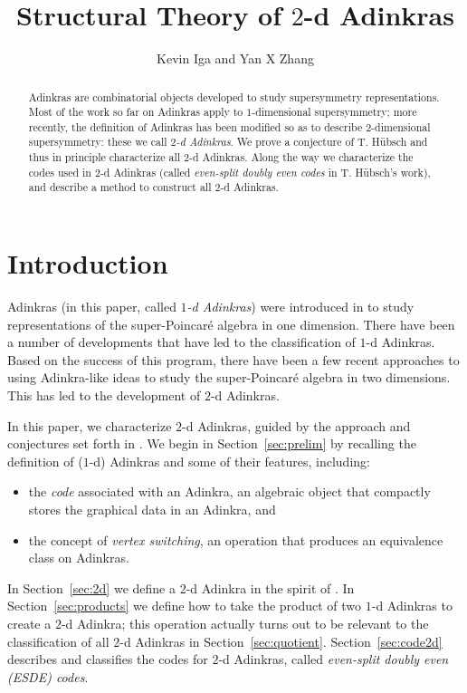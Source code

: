 \documentclass[12pt,twoside,singlespace]{article}
\title{Structural Theory of $2$-d Adinkras}
\author{Kevin Iga and Yan X Zhang}
\numberwithin{equation}{section}
\theoremstyle{definition}
\begin{document}
\pagestyle{plain}

\maketitle

\begin{abstract}
Adinkras are combinatorial objects developed to study supersymmetry representations. Most of the work so far on Adinkras apply to $1$-dimensional supersymmetry; more recently, the definition of Adinkras has been modified so as to describe $2$-dimensional supersymmetry: these we call \emph{$2$-d Adinkras}.  We prove a conjecture of T. H\"ubsch and thus in principle characterize all $2$-d Adinkras.  Along the way we characterize the codes used in $2$-d Adinkras (called \emph{even-split doubly even codes} in T. H\"ubsch's work), and describe a method to construct all $2$-d Adinkras.
\end{abstract}


\section{Introduction}
Adinkras (in this paper, called \emph{$1$-d Adinkras}) were introduced in \cite{d2l:first} to study representations of the super-Poincar\'e algebra in one dimension.  There have been a number of developments that have led to the classification of $1$-d Adinkras.\cite{d2l:graph-theoretic,d2l:omni,d2l:topology,zhang:adinkras,dil:cohomology,d2l:decodes}  Based on the success of this program, there have been a few recent approaches to using Adinkra-like ideas to study the super-Poincar\'e algebra in two dimensions.  This has led to the development of $2$-d Adinkras.\cite{gates:dimensional_extension,hubsch:weaving}

In this paper, we characterize $2$-d Adinkras, guided by the approach and conjectures set forth in \cite{hubsch:weaving}. We begin in Section~\ref{sec:prelim} by recalling the definition of ($1$-d) Adinkras and some of their features, including:
\begin{itemize}
\item the \emph{code} associated with an Adinkra, an algebraic object that compactly stores the graphical data in an Adinkra, and 
\item the concept of \emph{vertex switching}, an operation that produces an equivalence class on Adinkras.
\end{itemize} 
In Section~\ref{sec:2d} we define a $2$-d Adinkra in the spirit of \cite{gates:dimensional_extension,hubsch:weaving}.  In Section~\ref{sec:products} we define how to take the product of two $1$-d Adinkras to create a $2$-d Adinkra; this operation actually turns out to be relevant to the classification of all $2$-d Adinkras in Section~\ref{sec:quotient}. Section~\ref{sec:code2d} describes and classifies the codes for $2$-d Adinkras, called \emph{even-split doubly even (ESDE) codes}.
\end{document}
